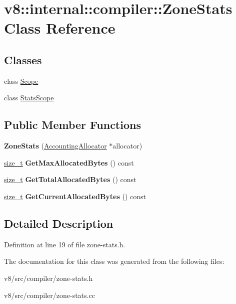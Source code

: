 \hypertarget{classv8_1_1internal_1_1compiler_1_1ZoneStats}{}\section{v8\+:\+:internal\+:\+:compiler\+:\+:Zone\+Stats Class Reference}
\label{classv8_1_1internal_1_1compiler_1_1ZoneStats}
\subsection*{Classes}
\begin{DoxyCompactItemize}
\item 
class \mbox{\hyperlink{classv8_1_1internal_1_1compiler_1_1ZoneStats_1_1Scope}{Scope}}
\item 
class \mbox{\hyperlink{classv8_1_1internal_1_1compiler_1_1ZoneStats_1_1StatsScope}{Stats\+Scope}}
\end{DoxyCompactItemize}
\subsection*{Public Member Functions}
\begin{DoxyCompactItemize}
\item 
\mbox{\label{classv8_1_1internal_1_1compiler_1_1ZoneStats_aa30868523f0a92528c526cfd874933b4}} 
{\bfseries Zone\+Stats} (\mbox{\hyperlink{classv8_1_1internal_1_1AccountingAllocator}{Accounting\+Allocator}} $\ast$allocator)
\item 
\mbox{\label{classv8_1_1internal_1_1compiler_1_1ZoneStats_a627275ea81c69d787522a68b32774973}} 
\mbox{\hyperlink{classsize__t}{size\+\_\+t}} {\bfseries Get\+Max\+Allocated\+Bytes} () const
\item 
\mbox{\label{classv8_1_1internal_1_1compiler_1_1ZoneStats_a03964bd55310b45bbc9dadd7f4a55ba3}} 
\mbox{\hyperlink{classsize__t}{size\+\_\+t}} {\bfseries Get\+Total\+Allocated\+Bytes} () const
\item 
\mbox{\label{classv8_1_1internal_1_1compiler_1_1ZoneStats_a5980597dd8f17eea2f62be56f563cbcf}} 
\mbox{\hyperlink{classsize__t}{size\+\_\+t}} {\bfseries Get\+Current\+Allocated\+Bytes} () const
\end{DoxyCompactItemize}


\subsection{Detailed Description}


Definition at line 19 of file zone-\/stats.\+h.



The documentation for this class was generated from the following files\+:\begin{DoxyCompactItemize}
\item 
v8/src/compiler/zone-\/stats.\+h\item 
v8/src/compiler/zone-\/stats.\+cc\end{DoxyCompactItemize}
